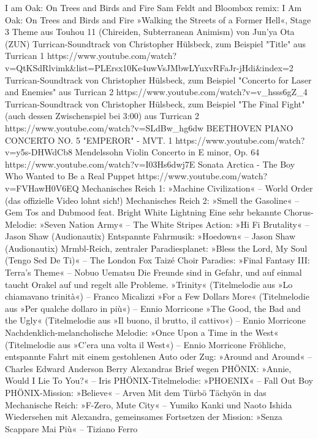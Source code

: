     I am Oak: On Trees and Birds and Fire
    Sam Feldt and Bloombox remix: I Am Oak: On Trees and Birds and Fire
    »Walking the Streets of a Former Hell«, Stage 3 Theme aus Touhou 11 (Chireiden, Subterranean Animism) von Jun'ya Ota (ZUN)
    Turrican-Soundtrack von Christopher Hülsbeck, zum Beispiel "Title" aus Turrican 1 https://www.youtube.com/watch?v=QtKSdRlvimk&list=PLErsx10Ke4uwVsJMbwLYuxvRFaJr-jHdi&index=2
    Turrican-Soundtrack von Christopher Hülsbeck, zum Beispiel "Concerto for Laser and Enemies" aus Turrican 2 https://www.youtube.com/watch?v=v_hsss6gZ_4
    Turrican-Soundtrack von Christopher Hülsbeck, zum Beispiel "The Final Fight" (auch dessen Zwischenspiel bei 3:00) aus Turrican 2 https://www.youtube.com/watch?v=SLdBw_hg6dw
    BEETHOVEN PIANO CONCERTO NO. 5 "EMPEROR" - MVT. 1 https://www.youtube.com/watch?v=y5s-DHWdCb8
    Mendelssohn Violin Concerto in E minor, Op. 64 https://www.youtube.com/watch?v=I03Hs6dwj7E
    Sonata Arctica - The Boy Who Wanted to Be a Real Puppet https://www.youtube.com/watch?v=FVHawH0V6EQ
    Mechanisches Reich 1: »Machine Civilization« – World Order (das offizielle Video lohnt sich!)
    Mechanisches Reich 2: »Smell the Gasoline« – Gem Tos and Dubmood feat. Bright White Lightning
    Eine sehr bekannte Chorus-Melodie: »Seven Nation Army« – The White Stripes
    Action: »Hi Fi Brutality« – Jason Shaw (Audionautix)
    Entspannte Fahrmusik: »Hoedown« – Jason Shaw (Audionautix)
    Mrmbl-Reich, zentraler Paradiesplanet: »Bless the Lord, My Soul (Tengo Sed De Ti)« – The London Fox Taizé Choir
    Paradies: »Final Fantasy III: Terra’s Theme« – Nobuo Uematsu
    Die Freunde sind in Gefahr, und auf einmal taucht Orakel auf und regelt alle Probleme. »Trinity« (Titelmelodie aus »Lo chiamavano trinità«) – Franco Micalizzi
    »For a Few Dollars More« (Titelmelodie aus »Per qualche dollaro in più«) – Ennio Morricone
    »The Good, the Bad and the Ugly« (Titelmelodie aus »Il buono, il brutto, il cattivo«) – Ennio Morricone
    Nachdenklich-melancholische Melodie: »Once Upon a Time in the West« (Titelmelodie aus »C’era una volta il West«) – Ennio Morricone
    Fröhliche, entspannte Fahrt mit einem gestohlenen Auto oder Zug: »Around and Around« – Charles Edward Anderson Berry
    Alexandras Brief wegen PHÖNIX: »Annie, Would I Lie To You?« – Iris
    PHÖNIX-Titelmelodie: »PHOENIX« – Fall Out Boy
    PHÖNIX-Mission: »Believe« – Arven
    Mit dem Türbö Tächyön in das Mechanische Reich: »F-Zero, Mute City« – Yumiko Kanki und Naoto Ishida
    Wiedersehen mit Alexandra, gemeinsames Fortsetzen der Mission: »Senza Scappare Mai Più« – Tiziano Ferro
